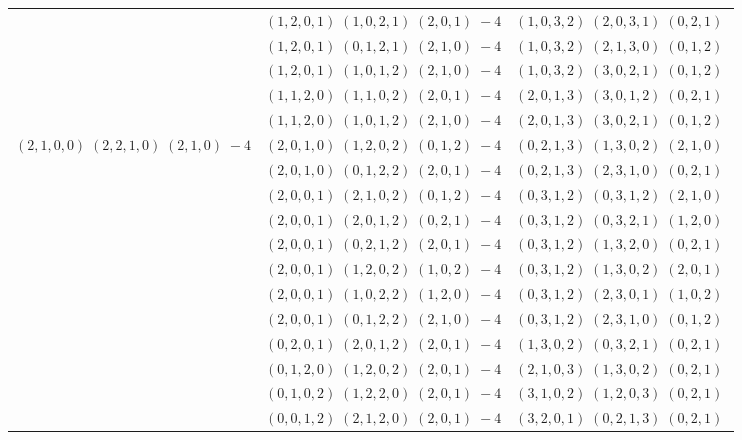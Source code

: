 \documentclass[11pt]{article}
\begin{document}
\begin{longtable}[l]{|c|c|c|}
 \cline{2-3} 
 & $(1 ,2 ,0 ,1) \;(1 ,0 ,2 ,1) \;(2 ,0 ,1) \;-4$ & $(1 ,0 ,3 ,2) \;(2 ,0 ,3 ,1) \;(0 ,2 ,1) \;$\\ 
 \cline{2-3} 
 & $(1 ,2 ,0 ,1) \;(0 ,1 ,2 ,1) \;(2 ,1 ,0) \;-4$ & $(1 ,0 ,3 ,2) \;(2 ,1 ,3 ,0) \;(0 ,1 ,2) \;$\\ 
 \cline{2-3} 
 & $(1 ,2 ,0 ,1) \;(1 ,0 ,1 ,2) \;(2 ,1 ,0) \;-4$ & $(1 ,0 ,3 ,2) \;(3 ,0 ,2 ,1) \;(0 ,1 ,2) \;$\\ 
 \cline{2-3} 
 & $(1 ,1 ,2 ,0) \;(1 ,1 ,0 ,2) \;(2 ,0 ,1) \;-4$ & $(2 ,0 ,1 ,3) \;(3 ,0 ,1 ,2) \;(0 ,2 ,1) \;$\\ 
 \cline{2-3} 
 & $(1 ,1 ,2 ,0) \;(1 ,0 ,1 ,2) \;(2 ,1 ,0) \;-4$ & $(2 ,0 ,1 ,3) \;(3 ,0 ,2 ,1) \;(0 ,1 ,2) \;$\\ \hline\multirow[t]{13}{*}{ $(2 ,1 ,0 ,0) \;(2 ,2 ,1 ,0) \;(2 ,1 ,0) \;-4$ }  & $(2 ,0 ,1 ,0) \;(1 ,2 ,0 ,2) \;(0 ,1 ,2) \;-4$ & $(0 ,2 ,1 ,3) \;(1 ,3 ,0 ,2) \;(2 ,1 ,0) \;$\\ 
 \cline{2-3} 
 & $(2 ,0 ,1 ,0) \;(0 ,1 ,2 ,2) \;(2 ,0 ,1) \;-4$ & $(0 ,2 ,1 ,3) \;(2 ,3 ,1 ,0) \;(0 ,2 ,1) \;$\\ 
 \cline{2-3} 
 & $(2 ,0 ,0 ,1) \;(2 ,1 ,0 ,2) \;(0 ,1 ,2) \;-4$ & $(0 ,3 ,1 ,2) \;(0 ,3 ,1 ,2) \;(2 ,1 ,0) \;$\\ 
 \cline{2-3} 
 & $(2 ,0 ,0 ,1) \;(2 ,0 ,1 ,2) \;(0 ,2 ,1) \;-4$ & $(0 ,3 ,1 ,2) \;(0 ,3 ,2 ,1) \;(1 ,2 ,0) \;$\\ 
 \cline{2-3} 
 & $(2 ,0 ,0 ,1) \;(0 ,2 ,1 ,2) \;(2 ,0 ,1) \;-4$ & $(0 ,3 ,1 ,2) \;(1 ,3 ,2 ,0) \;(0 ,2 ,1) \;$\\ 
 \cline{2-3} 
 & $(2 ,0 ,0 ,1) \;(1 ,2 ,0 ,2) \;(1 ,0 ,2) \;-4$ & $(0 ,3 ,1 ,2) \;(1 ,3 ,0 ,2) \;(2 ,0 ,1) \;$\\ 
 \cline{2-3} 
 & $(2 ,0 ,0 ,1) \;(1 ,0 ,2 ,2) \;(1 ,2 ,0) \;-4$ & $(0 ,3 ,1 ,2) \;(2 ,3 ,0 ,1) \;(1 ,0 ,2) \;$\\ 
 \cline{2-3} 
 & $(2 ,0 ,0 ,1) \;(0 ,1 ,2 ,2) \;(2 ,1 ,0) \;-4$ & $(0 ,3 ,1 ,2) \;(2 ,3 ,1 ,0) \;(0 ,1 ,2) \;$\\ 
 \cline{2-3} 
 & $(0 ,2 ,0 ,1) \;(2 ,0 ,1 ,2) \;(2 ,0 ,1) \;-4$ & $(1 ,3 ,0 ,2) \;(0 ,3 ,2 ,1) \;(0 ,2 ,1) \;$\\ 
 \cline{2-3} 
 & $(0 ,1 ,2 ,0) \;(1 ,2 ,0 ,2) \;(2 ,0 ,1) \;-4$ & $(2 ,1 ,0 ,3) \;(1 ,3 ,0 ,2) \;(0 ,2 ,1) \;$\\ 
 \cline{2-3} 
 & $(0 ,1 ,0 ,2) \;(1 ,2 ,2 ,0) \;(2 ,0 ,1) \;-4$ & $(3 ,1 ,0 ,2) \;(1 ,2 ,0 ,3) \;(0 ,2 ,1) \;$\\ 
 \cline{2-3} 
 & $(0 ,0 ,1 ,2) \;(2 ,1 ,2 ,0) \;(2 ,0 ,1) \;-4$ & $(3 ,2 ,0 ,1) \;(0 ,2 ,1 ,3) \;(0 ,2 ,1) \;$\\ 

\end{longtable}
\end{document}
